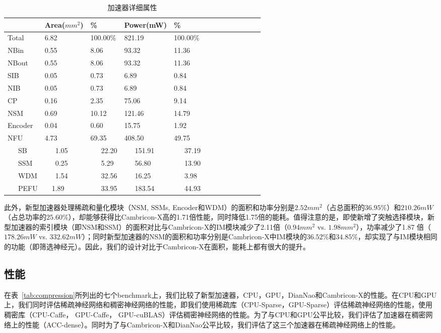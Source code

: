 \begin{table}[h]
\caption{加速器详细属性}
\centering
\label{tab:hardware}
\begin{tabular}{lllllllllllll}
\toprule
 & Area($mm^2$) & \% & Power(mW) & \% \\
\midrule
Total   & 6.82	& 100.00\% 	& 821.19    & 100.00\% \\
\midrule
NBin    & 0.55  & 8.06		& 93.32     & 11.36	\\
NBout   & 0.55  & 8.06	    & 93.32     & 11.36	\\
SIB     & 0.05 	& 0.73		& 6.89      & 0.84	\\
NIB     & 0.05  & 0.73      & 6.89      & 0.84  \\
CP      & 0.16 	& 2.35		& 75.06     & 9.14	\\
NSM     & 0.69 	& 10.12		& 121.46    & 14.79	\\
Encoder & 0.04  & 0.60      & 15.75     & 1.92  \\
NFU     & 4.73 	& 69.35 	& 408.50    & 49.75	\\
~~~SB   & ~~~1.05 	& ~~~22.20	& ~~~151.91 & ~~~37.19\\
~~~SSM  & ~~~0.25 	& ~~~5.29	& ~~~56.80  & ~~~13.90	\\
~~~WDM  & ~~~1.54 	& ~~~32.56	& ~~~16.25  & ~~~3.98	\\
~~~PEFU & ~~1.89	& ~~~33.95	& ~~~183.54 & ~~~44.93 \\
\bottomrule
\end{tabular}
\end{table}

此外，新型加速器处理稀疏和量化模块（NSM, SSMs, Encoder和WDM）的面积和功率分别是$2.52mm^2$（占总面积的$36.95\%$）和$210.26mW$（占总功率的$25.60\%$），却能够获得比Cambricon-X高的1.71倍性能，同时降低1.75倍的能耗。值得注意的是，即使新增了突触选择模块，新型加速器的索引模块（即NSM和SSM）的面积对比与Cambricon-X的IM模块减少了2.11倍（$0.94mm^2$ vs. $1.98mm^2$），功率减少了1.87 倍（$178.26mW$ vs. $332.62mW$）；同时新型加速器的NSM的面积和功率分别是Cambricon-X中IM模块的$36.52\%$和$34.85\%$，却实现了与IM模块相同的功能（即筛选神经元）。因此，我们的设计对比于Cambricon-X在面积，能耗上都有很大的提升。

\subsection{性能}
在表~\ref{tab:compression}所列出的七个benchmark上，我们比较了新型加速器，CPU，GPU，DianNao和Cambricon-X的性能。在CPU和GPU上，我们同时评估稀疏神经网络和稠密神经网络的性能，即我们使用稀疏库（CPU-Sparse，GPU-Sparse）评估稀疏神经网络的性能，使用稠密库（CPU-Caffe， GPU-Caffe， GPU-cuBLAS）评估稠密神经网络的性能。为了与CPU和GPU公平比较，我们评估了加速器在稠密网络上的性能（ACC-dense）。同时为了与Cambricon-X和DianNao公平比较，我们评估了这三个加速器在稀疏神经网络上的性能。

